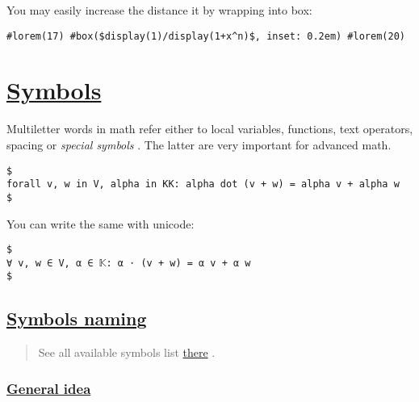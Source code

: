 \pandocbounded{}

You may easily increase the distance it by wrapping into box:

\begin{verbatim}
#lorem(17) #box($display(1)/display(1+x^n)$, inset: 0.2em) #lorem(20)
\end{verbatim}

\pandocbounded{}

\section{\texorpdfstring{\hyperref[symbols]{Symbols}}{Symbols}}\label{symbols}

Multiletter words in math refer either to local variables, functions,
text operators, spacing or \emph{special symbols} . The latter are very
important for advanced math.

\begin{verbatim}
$
forall v, w in V, alpha in KK: alpha dot (v + w) = alpha v + alpha w
$
\end{verbatim}

\pandocbounded{}

You can write the same with unicode:

\begin{verbatim}
$
∀ v, w ∈ V, α ∈ 𝕂: α ⋅ (v + w) = α v + α w
$
\end{verbatim}

\pandocbounded{}

\subsection{\texorpdfstring{\hyperref[symbols-naming]{Symbols
naming}}{Symbols naming}}\label{symbols-naming}

\begin{quote}
See all available symbols list
\href{https://typst.app/docs/reference/symbols/sym/}{there} .
\end{quote}

\subsubsection{\texorpdfstring{\hyperref[general-idea]{General
idea}}{General idea}}\label{general-idea}

